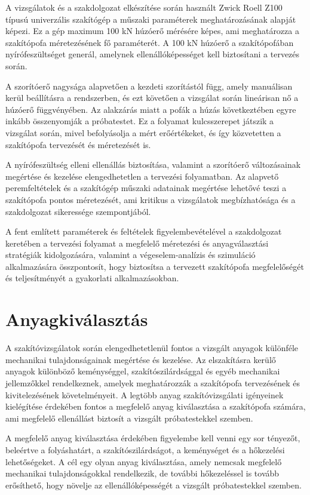 \documentclass[12pt,a4paper,oneside]{report}
\begin{document}
A vizsgálatok és a szakdolgozat elkészítése során használt Zwick Roell Z100 típusú univerzális szakítógép a műszaki paraméterek meghatározásának alapját képezi. Ez a gép maximum 100 kN húzóerő mérésére képes, ami meghatározza a szakítópofa méretezésének fő paraméterét. A 100 kN húzóerő a szakítópofában nyírófeszültséget generál, amelynek ellenállóképességet kell biztosítani a tervezés során.

A szorítóerő nagysága alapvetően a kezdeti szorítástól függ, amely manuálisan kerül beállításra a rendszerben, és ezt követően a vizsgálat során lineárisan nő a húzóerő függvényében. Az alakzárás miatt a pofák a húzás következtében egyre inkább összenyomják a próbatestet. Ez a folyamat kulcsszerepet játszik a vizsgálat során, mivel befolyásolja a mért erőértékeket, és így közvetetten a szakítópofa tervezését és méretezését is.

A nyírófeszültség elleni ellenállás biztosítása, valamint a szorítóerő változásainak megértése és kezelése elengedhetetlen a tervezési folyamatban. Az alapvető peremfeltételek és a szakítógép műszaki adatainak megértése lehetővé teszi a szakítópofa pontos méretezését, ami kritikus a vizsgálatok megbízhatósága és a szakdolgozat sikeressége szempontjából.

A fent említett paraméterek és feltételek figyelembevételével a szakdolgozat keretében a tervezési folyamat a megfelelő méretezési és anyagválasztási stratégiák kidolgozására, valamint a végeselem-analízis és szimuláció alkalmazására összpontosít, hogy biztosítsa a tervezett szakítópofa megfelelőségét és teljesítményét a gyakorlati alkalmazásokban.

\section{Anyagkiválasztás}
A szakítóvizsgálatok során elengedhetetlenül fontos a vizsgált anyagok különféle mechanikai tulajdonságainak megértése és kezelése. Az elszakításra kerülő anyagok különböző keménységgel, szakítószilárdsággal és egyéb mechanikai jellemzőkkel rendelkeznek, amelyek meghatározzák a szakítópofa tervezésének és kivitelezésének követelményeit. A legtöbb anyag szakítóvizsgálati igényeinek kielégítése érdekében fontos a megfelelő anyag kiválasztása a szakítópofa számára, ami megfelelő ellenállást biztosít a vizsgált próbatestekkel szemben.

A megfelelő anyag kiválasztása érdekében figyelembe kell venni egy sor tényezőt, beleértve a folyáshatárt, a szakítószilárdságot, a keménységet és a hőkezelési lehetőségeket. A cél egy olyan anyag kiválasztása, amely nemcsak megfelelő mechanikai tulajdonságokkal rendelkezik, de további hőkezeléssel is tovább erősíthető, hogy növelje az ellenállóképességét a vizsgált próbatestekkel szemben.
\end{document}
